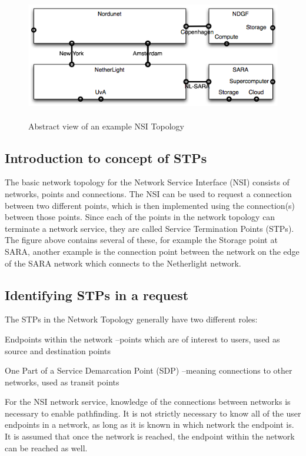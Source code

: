 \documentclass[12pt]{article}  %
\begin{document}
\begin{figure}[htbp]
\begin{center}
\includegraphics[width=390pt, height=159pt]{NSITopologyService-fig001.png}
\caption{Abstract view of an example NSI Topology}\label{fig:ndgf}
\end{center}
\end{figure}


\subsection{Introduction to concept of STPs}

 The basic network topology for the Network Service Interface (NSI) 
consists of networks, points and connections. The NSI can be used to request a 
connection between two different points, which is then implemented using the connection(s) 
between those points. Since each of the points in the network topology can terminate 
a network service, they are called Service Termination Points (STPs). The figure 
above contains several of these, for example the Storage point at SARA, another 
example is the connection point between the network on the edge of the SARA network 
which connects to the Netherlight network.\label{h.htn600ljqx1v}


\subsection{Identifying STPs in a request}

 The STPs in the Network Topology generally have two different 
roles:

 Endpoints within the network –points which are of interest to 
users, used as source and destination points

 One Part of a Service Demarcation Point (SDP) –meaning connections 
to other networks, used as transit points


 For the NSI network service, knowledge of the connections between 
networks is necessary to enable pathfinding. It is not strictly necessary to know 
all of the user endpoints in a network, as long as it is known in which network 
the endpoint is. It is assumed that once the network is reached, the endpoint within 
the network can be reached as well.
\end{document}
